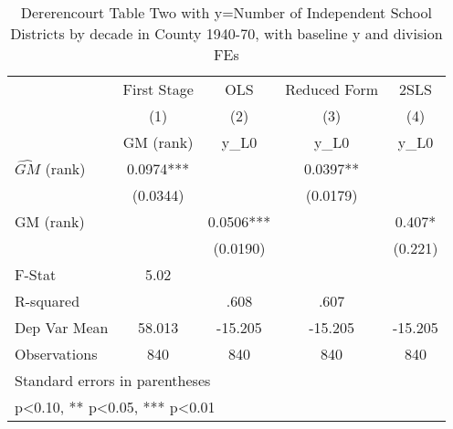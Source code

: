 \begin{table}[htbp]\centering
\def\sym#1{\ifmmode^{#1}\else\(^{#1}\)\fi}
\caption{Dererencourt Table Two with y=Number of Independent School Districts by decade in County 1940-70, with baseline y and division FEs}
\begin{tabular}{l*{4}{c}}
\toprule
                    & First Stage   &         OLS   &Reduced Form   &        2SLS   \\
                    &\multicolumn{1}{c}{(1)}&\multicolumn{1}{c}{(2)}&\multicolumn{1}{c}{(3)}&\multicolumn{1}{c}{(4)}\\
                    &\multicolumn{1}{c}{GM  (rank)}&\multicolumn{1}{c}{y\_L0}&\multicolumn{1}{c}{y\_L0}&\multicolumn{1}{c}{y\_L0}\\
\midrule
$\hat{GM}$ (rank)   &      0.0974***&               &      0.0397** &               \\
                    &    (0.0344)   &               &    (0.0179)   &               \\
\addlinespace
GM  (rank)          &               &      0.0506***&               &       0.407*  \\
                    &               &    (0.0190)   &               &     (0.221)   \\
\midrule
F-Stat              &        5.02   &               &               &               \\
R-squared           &               &        .608   &        .607   &               \\
Dep Var Mean        &      58.013   &     -15.205   &     -15.205   &     -15.205   \\
Observations        &         840   &         840   &         840   &         840   \\
\bottomrule
\multicolumn{5}{l}{\footnotesize Standard errors in parentheses}\\
\multicolumn{5}{l}{\footnotesize * p<0.10, ** p<0.05, *** p<0.01}\\
\end{tabular}
\end{table}
